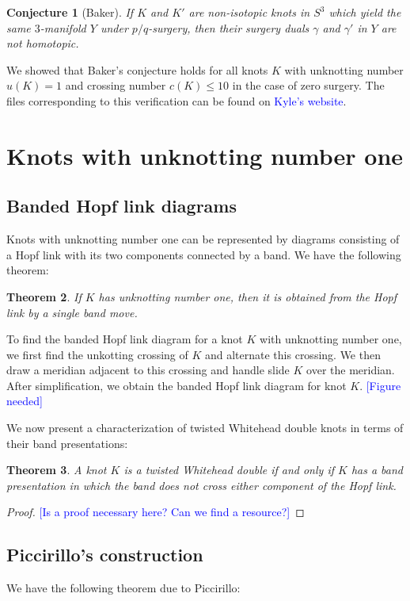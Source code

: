 \documentclass[11pt,usenames,dvipsnames,reqno]{amsart}
\newtheorem{theorem}{Theorem}
\numberwithin{theorem}{section}
\newtheorem{conjecture}[theorem]{Conjecture}
\theoremstyle{ex}
\theoremstyle{rem}
\def\kh#1{\textcolor{Blue}{#1}}
\begin{document}
\begin{conjecture}[Baker] If $K$ and $K'$ are non-isotopic knots in $S^3$ which yield the same $3$-manifold $Y$ under $p/q$-surgery, then their surgery duals $\gamma$ and $\gamma'$ in $Y$ are not homotopic.
\end{conjecture}

We showed that Baker's conjecture holds for all knots $K$ with unknotting number $u(K) = 1$ and crossing number $c(K) \leq 10$ in the case of zero surgery. The files corresponding to this verification can be found on \kh{Kyle's website}.


\section{Knots with unknotting number one}\label{sec:unknotting-one}


\subsection{Banded Hopf link diagrams} Knots with unknotting number one can be represented by diagrams consisting of a Hopf link with its two components connected by a band. We have the following theorem:

\begin {theorem} If $K$ has unknotting number one, then it is obtained from the Hopf link by a single band move.
\end{theorem}

To find the banded Hopf link diagram for a knot $K$ with unknotting number one, we first find the unkotting crossing of $K$ and alternate this crossing. We then draw a meridian adjacent to this crossing and handle slide $K$ over the meridian. After simplification, we obtain the banded Hopf link diagram for knot $K$. \kh{[Figure needed]}

We now present a characterization of twisted Whitehead double knots in terms of their band presentations:

\begin{theorem} A knot $K$ is a twisted Whitehead double if and only if $K$ has a band presentation in which the band does not cross either component of the Hopf link.
\end{theorem}
\begin{proof}
	\kh{[Is a proof necessary here? Can we find a resource?]}
\end{proof}

\subsection{Piccirillo's construction} We have the following theorem due to Piccirillo:
\end{document}
